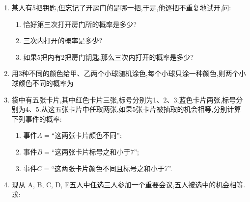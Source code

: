 \begin{enumerate}
    
    \item 某人有5把钥匙,但忘记了开房门的是哪一把,于是,他逐把不重复地试开,问:
    \begin{enumerate}
    \item 恰好第三次打开房门所的概率是多少?
    \item 三次内打开的概率是多少?
    \item 如果5把内有2把房门钥匙,那么三次内打开的概率是多少?
    \end{enumerate}
    \begin{jieda}
    \end{jieda}
        
    \item 用3种不同的颜色给甲、乙两个小球随机涂色,每个小球只涂一种颜色,则两个小球颜色不同的概率为
    
    \item 袋中有五张卡片,其中红色卡片三张,标号分别为1、2、3;蓝色卡片两张,标号分别为4、5.从这五张卡片中任取两张,如果5张卡片被抽取的机会相等,分别计算下列事件的概率:
    \begin{enumerate}
    \item 事件$A=$“这两张卡片颜色不同”;
    \item 事件$B=$“这两张卡片标号之和小于7”;
    \item 事件$C=$“这两张卡片颜色不同且标号之和小于7”.
    \end{enumerate}
    
    \begin{jieda}
    \end{jieda}
    
    \item 现从 A, B, C, D, E五人中任选三人参加一个重要会议,五人被选中的机会相等.求:
    

\end{enumerate}
